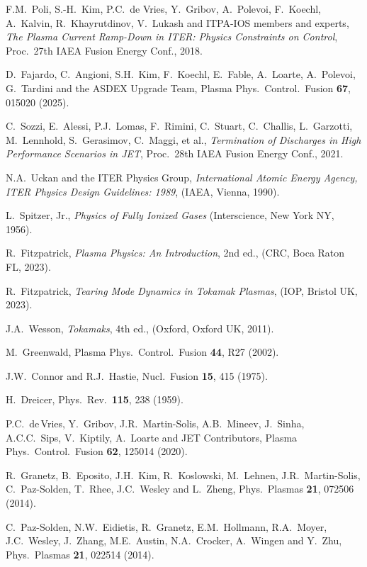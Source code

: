 \documentclass{iopjournal}
\begin{document}
\begin{thebibliography}{99}
 F.M.~Poli, S.-H.~Kim, P.C.~de Vries, Y.~Gribov, A.~Polevoi, F.~Koechl, A.~Kalvin, R.~Khayrutdinov, V.~Lukash
and ITPA-IOS members and experts, {\em The Plasma Current Ramp-Down in ITER: Physics Constraints on Control}, 
Proc.\   27th  IAEA Fusion Energy Conf., 2018. 
  
 D.~Fajardo, C.~Angioni, S.H.~Kim, F.~Koechl, E.~Fable, A.~Loarte, A.~Polevoi, G.~Tardini and the ASDEX Upgrade Team,
Plasma Phys.\ Control.\ Fusion {\bf 67}, 015020 (2025). 

 C.~Sozzi, E.~Alessi, P.J.~Lomas, F.~Rimini, C.~Stuart, C.~Challis, L.~Garzotti, M.~Lennhold, S.~Gerasimov, 
C.~Maggi, et al., {\em Termination of Discharges in High Performance Scenarios in JET}, Proc.\  28th IAEA Fusion Energy Conf., 2021. 

 N.A.~Uckan and the ITER Physics Group, {\em International Atomic Energy Agency, ITER Physics Design Guidelines: 1989},  (IAEA, Vienna, 1990).

 L.~Spitzer, Jr., {\em Physics of Fully Ionized Gases}\/ (Interscience, New York NY, 1956).

 R.~Fitzpatrick, {\em Plasma Physics: An Introduction}, 2nd ed., (CRC, Boca Raton FL, 2023).

 R.~Fitzpatrick, {\em Tearing Mode Dynamics in Tokamak Plasmas}, (IOP, Bristol UK, 2023).

 J.A.~Wesson, {\em Tokamaks}, 4th ed., (Oxford, Oxford UK, 2011).

 M.~Greenwald, Plasma Phys.\ Control.\ Fusion {\bf 44}, R27 (2002).

 J.W.~Connor and R.J.~Hastie, Nucl.\ Fusion {\bf 15}, 415 (1975).

 H.~Dreicer, Phys.\ Rev.\ {\bf 115}, 238 (1959).

 P.C.~de\,Vries, Y.~Gribov, J.R.~Martin-Solis, A.B.~Mineev, J.~Sinha, A.C.C.~Sips, V.~Kiptily, A.~Loarte and JET Contributors, Plasma Phys.\ Control.\ Fusion
{\bf 62}, 125014 (2020). 

 R.~Granetz, B.~Eposito, J.H.~Kim, R.~Koslowski, M.~Lehnen, J.R.~Martin-Solis, C.~Paz-Solden, T.~Rhee, J.C.~Wesley
and L.~Zheng, Phys.\ Plasmas {\bf 21}, 072506 (2014).

 C.~Paz-Solden,  N.W.~Eidietis,  R.~Granetz, E.M.~Hollmann, R.A.~Moyer, J.C.~Wesley, J.~Zhang, M.E.~Austin, N.A.~Crocker, A.~Wingen and Y.~Zhu, 
 Phys.\ Plasmas {\bf 21}, 022514 (2014).


\end{thebibliography}
\end{document}
